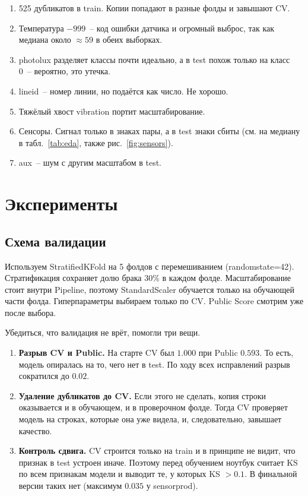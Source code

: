 \documentclass[11pt,a4paper,twocolumn]{article}
\newcommand{\f}[1]{{\ttfamily\def\_{\textunderscore\allowbreak}#1}}
\begin{document}
\begin{enumerate}
    \item 525 дубликатов в \f{train}. Копии попадают в разные фолды и завышают CV.
    \item Температура $-999$~-- код ошибки датчика и огромный выброс, так как медиана около $\approx 59$ в обеих выборках.
    \item \f{photo\_lux} разделяет классы почти идеально, а в \f{test} похож только на класс 0~-- вероятно, это утечка.
    \item \f{line\_id}~-- номер линии, но подаётся как число. Не хорошо.
    \item Тяжёлый хвост \f{vibration} портит масштабирование.
    \item Сенсоры. Сигнал только в знаках пары, а в \f{test} знаки сбиты (см. на медиану в  табл.~\ref{tab:eda}, также рис.~\ref{fig:sensors}).
    \item \f{aux\_*}~-- шум с другим масштабом в \f{test}.
\end{enumerate}

\section{Эксперименты}
\label{sec:experiments}

\subsection{Схема валидации}

Используем \f{StratifiedKFold} на 5 фолдов с перемешиванием (\f{random\_state=42}). Стратификация сохраняет долю брака $30\%$ в каждом фолде. Масштабирование стоит внутри \f{Pipeline}, поэтому \f{StandardScaler} обучается только на обучающей части фолда. Гиперпараметры выбираем только по CV. Public Score смотрим уже после выбора.

Убедиться, что валидация не врёт, помогли три вещи.
\begin{enumerate}
    \item \textbf{Разрыв CV и Public.} На старте CV был $1.000$ при Public $0.593$. То есть, модель опиралась на то, чего нет в \f{test}. По ходу всех исправлений разрыв сократился до $0.02$.
    \item \textbf{Удаление дубликатов до CV.} Если этого не сделать, копия строки оказывается и в обучающем, и в проверочном фолде. Тогда CV проверяет модель на строках, которые она уже видела, и, следовательно, завышает качество.
    \item \textbf{Контроль сдвига.} CV строится только на \f{train} и в принципе не видит, что признак в \f{test} устроен иначе. Поэтому перед обучением ноутбук считает KS по всем признакам модели и выводит те, у которых KS $> 0.1$. В финальной версии таких нет (максимум $0.035$ у \f{sensor\_prod}).
\end{enumerate}
\end{document}
